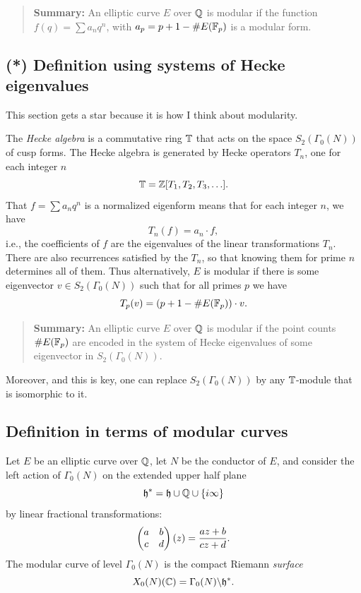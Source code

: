 \documentclass{book}
\begin{document}
\begin{quote}
{\bf Summary:} An elliptic curve $E$ over $\mathbb{Q}$ is modular if
the function $f(q) = \sum a_n q^n$, with $a_p = p+1-\#E(\mathbb{F}_p)$
is a modular form.
\end{quote}

\subsection{(*) Definition using systems of Hecke eigenvalues}\label{sec:modhecke}
This section gets a star because it is how I think about
modularity.

The {\em Hecke algebra} is a commutative ring $\mathbb{T}$ that acts on
the space $S_2(\Gamma_0(N))$ of cusp forms. The Hecke algebra
is generated by Hecke operators $T_n$, one for each integer $n$
$$
  \mathbb{T} = \mathbb{Z}[T_1, T_2, T_3, \ldots].
$$
That $f=\sum a_n q^n$ is a normalized eigenform means that  for each
integer $n$, we have
$$
  T_n(f) = a_n \cdot f,
$$
i.e., the coefficients of $f$ are the eigenvalues of the linear
transformations $T_n$.  There are also recurrences satisfied
by the $T_n$, so that knowing them for prime $n$ determines
all of them.
Thus alternatively, $E$ is modular if there is some eigenvector
$v \in S_2(\Gamma_0(N))$ such that for all primes $p$ we have
$$
  T_p(v) = (p+1 - \# E(\mathbb{F}_p)) \cdot v.
$$

\begin{quote}
{\bf Summary:} An elliptic curve $E$ over $\mathbb{Q}$ is modular if
the point counts $\# E(\mathbb{F}_p)$ are encoded in the system
of Hecke eigenvalues of some eigenvector in $S_2(\Gamma_0(N))$.
\end{quote}

  Moreover, and this is key, one can replace $S_2(\Gamma_0(N))$ by any $\mathbb{T}$-module that is isomorphic
to it.


\subsection{Definition in terms of modular curves}

Let $E$ be an elliptic curve over $\mathbb{Q}$, let $N$
be the conductor of $E$, and consider the left action
of $\Gamma_0(N)$ on the extended upper half plane
$$
\mathfrak{h}^*=\mathfrak{h}\cup\mathbb{Q}\cup\{i\infty\}
$$
by linear fractional transformations:
$$
\left( \begin{matrix}a&b\\c&d \end{matrix}\right)(z) = \frac{az+b}{cz+d}.
$$
The modular curve of level $\Gamma_0(N)$ is the compact Riemann {\em surface}
$$
  X_0(N)(\mathbb{C}) = \Gamma_0(N) \backslash \mathfrak{h}^*.
$$
\end{document}

